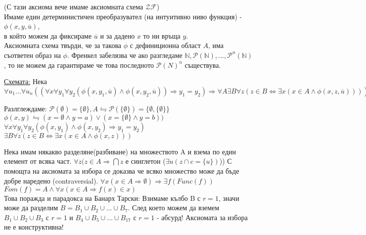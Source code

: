 \documentclass[fleqn, titlepage, 12pt]{report}
\begin{document}
 (С тази аксиома вече имаме аксиомната схема $ \mathcal{ZF} $) \\
Имаме един детерминистичен преобразувател (на интуитивно ниво функция) - $ \phi(x,y,\overline{u})$,\\
в който можем да фиксираме $\overline{u}$ и за дадено $ x $ то ни връща $ y $.\\
Аксиомната схема твърди, че за такова $\phi$ с дефиниционна област $ A $, има съответен образ на $\phi$. Френкел забелязва че ако разгледаме $ \mathbb{N}, \mathcal{P}( \mathbb{N}), ..., \mathcal{P}^n( \mathbb{N})  $, то не можем да гарантираме че това последното $ \mathcal{P}(N)^n $ съществува.
\bigbreak

\underline{Схемата:} Нека
$\forall{u_1}... \forall{u_n} ((\forall{x} \forall{y_1} \forall{y_2}  (\phi(x,y_1,\overline{u})\land \phi(x,y_2,\overline{u})) \Rightarrow y_1 = y_2) \Rightarrow \forall{A} \exists{B} \forall{z} (z \in B \Leftrightarrow \exists{x} (x \in A \land \phi(x,z,\overline{u}))))$
\bigbreak

Разлглеждаме: $ \mathcal{P}(\emptyset) = \{ \emptyset\}, A \leftrightharpoons \mathcal{P}(\{\emptyset\}) = \{ \emptyset, \{ \emptyset\}\} $\\
$ \phi(x,y) \leftrightharpoons (x = \emptyset \land y = a) \lor (x = \{ \emptyset\} \land y = b) )$\\
$ \forall{x} \forall{y_1} \forall{y_2} ( \phi(x,y_1) \land \phi(x,y_2) \Rightarrow  y_1 = y_2)$\\
$ \exists{B} \forall{z} (z \in B \Leftrightarrow \exists{x} (x \in A \land \phi(x,z)))$\\
\bigbreak

 Нека имам някакво разделяне(разбиване) на множеството A и взема по един елемент от всяка част.
$ \forall{z} (z \in A \Rightarrow  \bigcap z$ е синглетон ($ \exists{u} (z \cap c = \{ u\})$))
\bigbreak
С помощта на аксиомата за избора се доказва че всяко множество може да бъде добре наредено (contraversial).
$ \forall{x} (x \in A \Rightarrow \emptyset) \Rightarrow \exists{f} (Func(f))$\\
$ Fom(f) = A \land \forall{x} (x \in A \Rightarrow f(x) \in x)$\\
Това поражда и парадокса на Банарх Тарски: Взимаме кълбо B с $r = 1$,
значи може да разделим $B = B_1 \cup B_2 \cup ... \cup B_7$. След което можем да вземем
$B_1 \cup B_2 \cup B_3$ с $r = 1$ и $B_4 \cup B_5 \cup ... \cup B_17$ с $r = 1$ - абсурд!
Аксиомата за избора не е конструктивна!
\bigbreak
\end{document}
